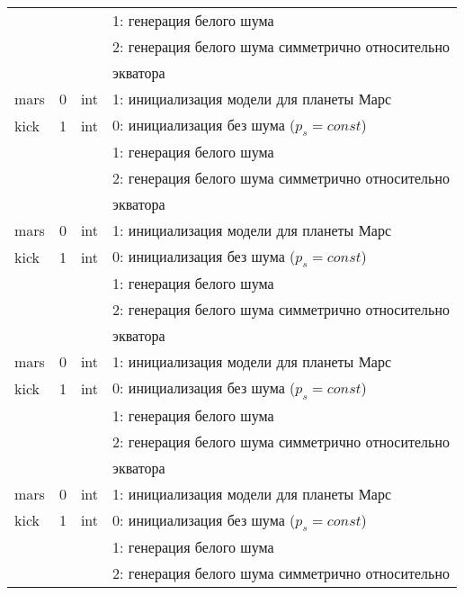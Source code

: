\begin{longtable}[c]{|l|c|l|l|}
             &        &     & 1: генерация белого шума                          \\
             &        &     & 2: генерация белого шума симметрично относительно \\
             &        &     & экватора                                          \\
    mars     & 0      & int & 1: инициализация модели для планеты Марс          \\
    kick     & 1      & int & 0: инициализация без шума (\(p_s = const\))       \\
             &        &     & 1: генерация белого шума                          \\
             &        &     & 2: генерация белого шума симметрично относительно \\
             &        &     & экватора                                          \\
    mars     & 0      & int & 1: инициализация модели для планеты Марс          \\
    kick     & 1      & int & 0: инициализация без шума (\(p_s = const\))       \\
             &        &     & 1: генерация белого шума                          \\
             &        &     & 2: генерация белого шума симметрично относительно \\
             &        &     & экватора                                          \\
    mars     & 0      & int & 1: инициализация модели для планеты Марс          \\
    kick     & 1      & int & 0: инициализация без шума (\(p_s = const\))       \\
             &        &     & 1: генерация белого шума                          \\
             &        &     & 2: генерация белого шума симметрично относительно \\
             &        &     & экватора                                          \\
    mars     & 0      & int & 1: инициализация модели для планеты Марс          \\
    kick     & 1      & int & 0: инициализация без шума (\(p_s = const\))       \\
             &        &     & 1: генерация белого шума                          \\
             &        &     & 2: генерация белого шума симметрично относительно \\

\end{longtable}

